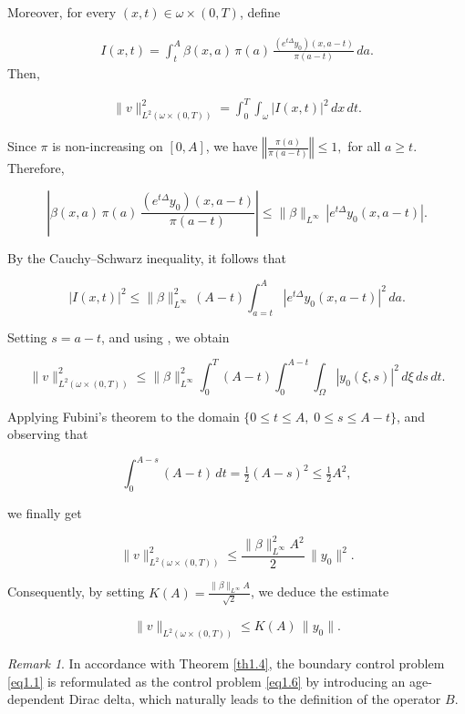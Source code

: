 \documentclass[10pt, a4]{amsart}
\makeatletter
\theoremstyle{plain}
\theoremstyle{definition}
\theoremstyle{remark}
\newtheorem{remark}[lemma]{Remark}
\renewenvironment{proof}[1][\proofname]{\par
  \pushQED{\qed}%
  \normalfont \topsep6\p@\@plus6\p@\relax
  \trivlist
  \item[\hskip\labelsep
        \itshape
    #1\ \ref{#1}.]\ignorespaces
}{%
  \popQED\endtrivlist\@endpefalse
}
\numberwithin{equation}{section}
\makeatother
\begin{document}
\begin{proof}[of Theorem \ref{th1.4}]
 Moreover, for every $(x,t)\in\omega\times(0,T)$, define

\begin{align}
  I(x,t)=\int_{t}^{A}\beta(x,a)\,\pi(a)\,\frac{(e^{t\Delta}y_{0})(x,a-t)}{\pi(a-t)}\,da.  
\end{align}
Then,

\begin{align}
    \|v\|^2_{L^2(\omega\times(0,T))} = \int_{0}^{T}\!\int_{\omega}|I(x,t)|^2\,dx\,dt.
\end{align}

Since $\pi$ is non-increasing on $[0,A]$, we have $\left\Vert \frac{\pi(a)}{\pi(a-t)} \right\Vert \leq 1,$ for all $a \ge t$. Therefore,

$$
\left|\beta(x,a)\,\pi(a)\,\frac{(e^{t\Delta}y_{0})(x,a-t)}{\pi(a-t)}\right|
\le \|\beta\|_{L^\infty}\,\left|e^{t\Delta}y_{0}(x,a-t)\right|.
$$

By the Cauchy–Schwarz inequality, it follows that

$$
|I(x,t)|^2 \le \|\beta\|_{L^\infty}^2\,(A-t)\int_{a=t}^{A}\left|e^{t\Delta}y_{0}(x,a-t)\right|^2\,da.
$$

Setting $s = a - t$, and using \cite[Lemma 4.1]{ref3}, we obtain

$$
\|v\|^2_{L^2(\omega\times(0,T))} \le \|\beta\|_{L^\infty}^2\int_{0}^{T}(A-t)\int_{0}^{A-t}\!\int_{\Omega}|y_{0}(\xi,s)|^2\,d\xi\,ds\,dt.
$$

Applying Fubini’s theorem to the domain $\{0 \le t \le A,\; 0 \le s \le A-t\}$, and observing that

$$
\int_{0}^{A-s}(A-t)\,dt = \tfrac12(A-s)^2 \le \tfrac12 A^2,
$$

we finally get

$$
\|v\|^2_{L^2(\omega\times(0,T))} \le  \frac{\|\beta\|_{L^\infty}^2 A^2}{2} \,\|y_{0}\|^2.
$$

Consequently, by setting $K(A) =\frac{ \|\beta\|_{L^\infty} A}{\sqrt{2}}$, we deduce the estimate

\begin{align}
    \|v\|_{L^2(\omega\times(0,T))} \le K(A)\,\|y_{0}\|.
\end{align}

\end{proof}
\begin{remark}
In accordance with Theorem \ref{th1.4}, the boundary control problem \eqref{eq1.1} is reformulated as the control problem \eqref{eq1.6} by introducing an age-dependent Dirac delta, which naturally leads to the definition of the operator $B$.
\end{remark}
\end{document}
